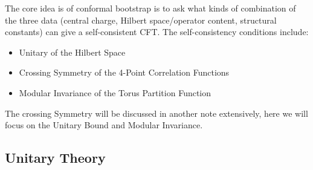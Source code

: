 
The core idea is of conformal bootstrap is to ask what kinds of
combination of the three data (central charge, Hilbert space/operator
content, structural constants) can give a self-consistent CFT. The
self-consistency conditions include:
\begin{itemize}
  \item Unitary of the Hilbert Space
  \item Crossing Symmetry of the 4-Point Correlation Functions
  \item Modular Invariance of the Torus Partition Function
\end{itemize}
The crossing Symmetry will be discussed in another note extensively,
here we will focus on the Unitary Bound and Modular Invariance.

\subsection{Unitary Theory}

